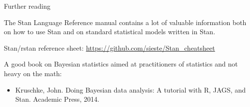 \begin{frame}{Further reading}

The Stan Language Reference manual contains a lot of valuable information both on how to use Stan and on standard statistical models written in Stan.

\bigskip

Stan/rstan reference sheet: \url{https://github.com/sieste/Stan_cheatsheet}

\bigskip

A good book on Bayesian statistics aimed at practitioners of statistics and not heavy on the math:

\begin{scriptsize}
\begin{itemize}
\item[] Kruschke, John. Doing Bayesian data analysis: A tutorial with R, JAGS, and Stan. Academic Press, 2014.
\end{itemize}
\end{scriptsize}
\end{frame}



